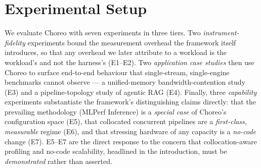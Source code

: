 %
%
%
\providecommand{\sysname}{Choreo}
%

\section{Experimental Setup}
\label{sec:setup}

We evaluate \sysname{} with seven experiments in three tiers.
Two \emph{instrument-fidelity} experiments bound the measurement overhead
the framework itself introduces, so that any overhead we later attribute
to a workload is the workload's and not the harness's
(E1--E2). Two \emph{application case studies} then use \sysname{} to
surface end-to-end behaviour that single-stream, single-engine benchmarks
cannot observe --- a unified-memory bandwidth-contention study (E3) and a
pipeline-topology study of agentic RAG (E4). Finally, three
\emph{capability} experiments substantiate the framework's distinguishing
claims directly: that the prevailing methodology (MLPerf Inference) is a
\emph{special case} of \sysname{}'s configuration space (E5), that
collocated concurrent pipelines are a \emph{first-class, measurable}
regime (E6), and that stressing hardware of any capacity is a
\emph{no-code} change (E7). E5--E7 are the direct response to the concern
that collocation-aware profiling and no-code scalability, headlined in the
introduction, must be \emph{demonstrated} rather than asserted.

